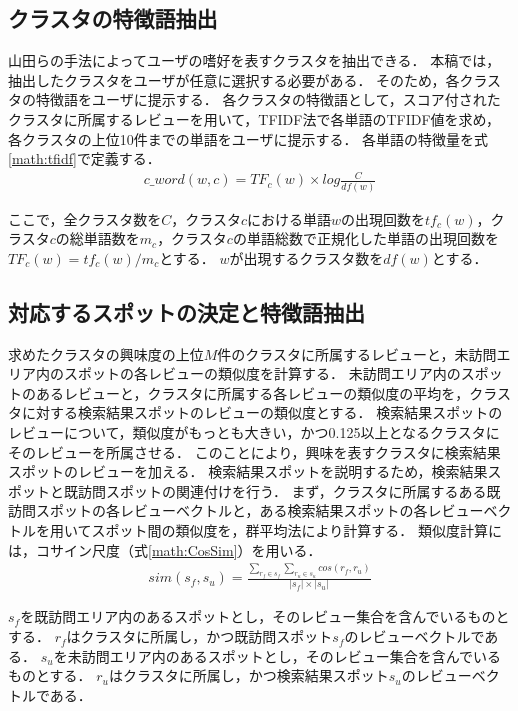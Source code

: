 \documentclass{deimj}
\begin{document}
\subsection{クラスタの特徴語抽出}
\label{sub:クラスタの特徴語抽出}
山田ら\cite{山田}の手法によってユーザの嗜好を表すクラスタを抽出できる．
本稿では，抽出したクラスタをユーザが任意に選択する必要がある．
そのため，各クラスタの特徴語をユーザに提示する．
各クラスタの特徴語として，スコア付されたクラスタに所属するレビューを用いて，TFIDF法で各単語のTFIDF値を求め，各クラスタの上位10件までの単語をユーザに提示する．
各単語の特徴量を式\ref{math:tfidf}で定義する．
\begin{eqnarray}
c\_word(w,c) = TF_{c}(w) \times log\frac{C}{df(w)}
    \label{math:tfidf}
\end{eqnarray}

ここで，全クラスタ数を$C$，クラスタ$c$における単語$w$の出現回数を$tf_{c}(w)$，クラスタ$c$の総単語数を$m_c$，クラスタ$c$の単語総数で正規化した単語の出現回数を$TF_c(w)=tf_c(w)/m_c$とする．
$w$が出現するクラスタ数を$df(w)$とする．
\subsection{対応するスポットの決定と特徴語抽出}
求めたクラスタの興味度の上位$M$件のクラスタに所属するレビューと，未訪問エリア内のスポットの各レビューの類似度を計算する．
未訪問エリア内のスポットのあるレビューと，クラスタに所属する各レビューの類似度の平均を，クラスタに対する検索結果スポットのレビューの類似度とする．
検索結果スポットのレビューについて，類似度がもっとも大きい，かつ0.125以上となるクラスタにそのレビューを所属させる．
このことにより，興味を表すクラスタに検索結果スポットのレビューを加える．
検索結果スポットを説明するため，検索結果スポットと既訪問スポットの関連付けを行う．
まず，クラスタに所属するある既訪問スポットの各レビューベクトルと，ある検索結果スポットの各レビューベクトルを用いてスポット間の類似度を，群平均法により計算する．
類似度計算には，コサイン尺度（式\ref{math:CosSim}）を用いる．
\begin{eqnarray}
  sim(s_f,s_u)=\frac{\sum_{r_f \in s_f} \sum_{r_u \in s_u} cos(r_f,r_u)}{|s_f| \times |s_u|}
  \label{math:CosSim}
\end{eqnarray}

$s_f$を既訪問エリア内のあるスポットとし，そのレビュー集合を含んでいるものとする．
$r_f$はクラスタに所属し，かつ既訪問スポット$s_f$のレビューベクトルである．
$s_u$を未訪問エリア内のあるスポットとし，そのレビュー集合を含んでいるものとする．
$r_u$はクラスタに所属し，かつ検索結果スポット$s_u$のレビューベクトルである．
\end{document}
